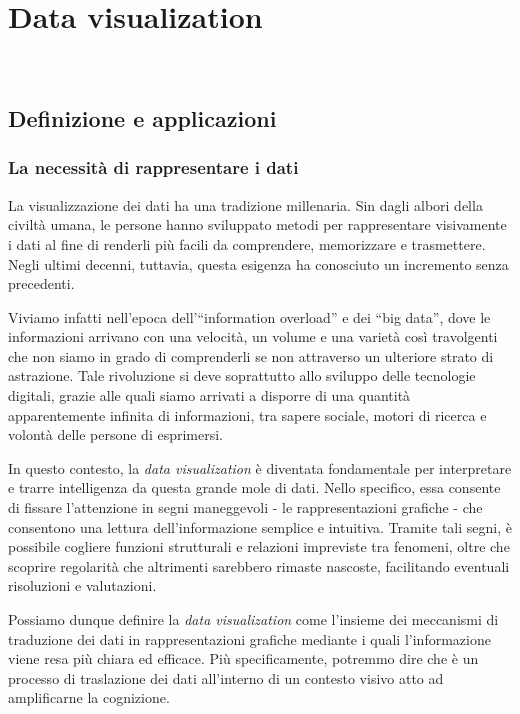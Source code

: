 \chapter{Data visualization}
\label{cap:studio_data_viz}
\\

\section{Definizione e applicazioni}

\subsection{La necessità di rappresentare i dati}
La visualizzazione dei dati ha una tradizione millenaria. Sin dagli albori della civiltà umana, 
le persone hanno sviluppato metodi per rappresentare visivamente i dati al fine di renderli più facili da comprendere, 
memorizzare e trasmettere.
Negli ultimi decenni, tuttavia, questa esigenza ha conosciuto un incremento senza precedenti.

Viviamo infatti nell'epoca dell'``information overload'' e dei ``big data'', dove le informazioni
arrivano con una velocità, un volume e una varietà così travolgenti che non siamo in grado di comprenderli se non attraverso
un ulteriore strato di astrazione.
Tale rivoluzione si deve soprattutto allo sviluppo delle tecnologie digitali, grazie alle quali siamo arrivati a disporre di una quantità 
apparentemente infinita di informazioni, tra sapere sociale, motori di ricerca e volontà delle persone di esprimersi.

In questo contesto, la \emph{data visualization} è diventata fondamentale per interpretare e trarre intelligenza da questa grande mole di dati.
Nello specifico, essa consente di fissare l'attenzione in segni maneggevoli - le rappresentazioni grafiche - che consentono una lettura dell'informazione
semplice e intuitiva. Tramite tali segni, è possibile cogliere funzioni strutturali e relazioni impreviste tra fenomeni, oltre che scoprire regolarità che 
altrimenti sarebbero rimaste nascoste, facilitando eventuali risoluzioni e valutazioni.

\bigskip
\noindent Possiamo dunque definire la \emph{data visualization} come l'insieme dei meccanismi di traduzione dei dati in rappresentazioni grafiche
mediante i quali l'informazione viene resa più chiara ed efficace. Più specificamente, 
potremmo dire che è un processo di traslazione dei dati all'interno di un contesto visivo atto ad amplificarne la cognizione.

